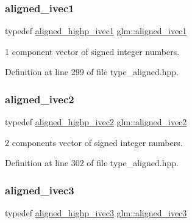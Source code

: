 \subsubsection{\texorpdfstring{aligned\_ivec1}{aligned\_ivec1}}
{\footnotesize\ttfamily typedef \mbox{\hyperlink{group__gtc__type__aligned_gaebfad60737b3a3ec596dc0341ed538c3}{aligned\+\_\+highp\+\_\+ivec1}} \mbox{\hyperlink{group__gtc__type__aligned_gafe9657c41fa58e912f99e92284d79fce}{glm\+::aligned\+\_\+ivec1}}}



1 component vector of signed integer numbers. 



Definition at line 299 of file type\+\_\+aligned.\+hpp.

\mbox{\label{group__gtc__type__aligned_ga2a709e1d21f3aae3f8d6de910f5fdff4}} 
\subsubsection{\texorpdfstring{aligned\_ivec2}{aligned\_ivec2}}
{\footnotesize\ttfamily typedef \mbox{\hyperlink{group__gtc__type__aligned_ga9fe485a34b77916c1817ab4ba2ad3b20}{aligned\+\_\+highp\+\_\+ivec2}} \mbox{\hyperlink{group__gtc__type__aligned_ga2a709e1d21f3aae3f8d6de910f5fdff4}{glm\+::aligned\+\_\+ivec2}}}



2 components vector of signed integer numbers. 



Definition at line 302 of file type\+\_\+aligned.\+hpp.

\mbox{\label{group__gtc__type__aligned_gabbf85e492d39baef3a418c15c996ab65}} 
\subsubsection{\texorpdfstring{aligned\_ivec3}{aligned\_ivec3}}
{\footnotesize\ttfamily typedef \mbox{\hyperlink{group__gtc__type__aligned_gac7f1892e381baa066488c0b6d1bf16ad}{aligned\+\_\+highp\+\_\+ivec3}} \mbox{\hyperlink{group__gtc__type__aligned_gabbf85e492d39baef3a418c15c996ab65}{glm\+::aligned\+\_\+ivec3}}}



